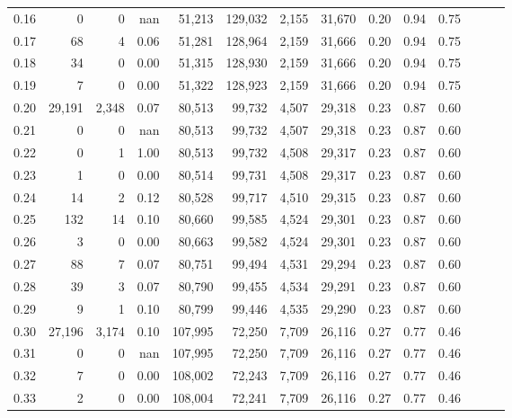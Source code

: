 \begin{tabular}{rrrrrrrrrrrrrr}
0.16 &       0 &      0 &   nan &   51,213 &  129,032 &   2,155 &  31,670 &  0.20 &  0.94 &      0.75 \\
0.17 &      68 &      4 &  0.06 &   51,281 &  128,964 &   2,159 &  31,666 &  0.20 &  0.94 &      0.75 \\
0.18 &      34 &      0 &  0.00 &   51,315 &  128,930 &   2,159 &  31,666 &  0.20 &  0.94 &      0.75 \\
0.19 &       7 &      0 &  0.00 &   51,322 &  128,923 &   2,159 &  31,666 &  0.20 &  0.94 &      0.75 \\
0.20 &  29,191 &  2,348 &  0.07 &   80,513 &   99,732 &   4,507 &  29,318 &  0.23 &  0.87 &      0.60 \\
0.21 &       0 &      0 &   nan &   80,513 &   99,732 &   4,507 &  29,318 &  0.23 &  0.87 &      0.60 \\
0.22 &       0 &      1 &  1.00 &   80,513 &   99,732 &   4,508 &  29,317 &  0.23 &  0.87 &      0.60 \\
0.23 &       1 &      0 &  0.00 &   80,514 &   99,731 &   4,508 &  29,317 &  0.23 &  0.87 &      0.60 \\
0.24 &      14 &      2 &  0.12 &   80,528 &   99,717 &   4,510 &  29,315 &  0.23 &  0.87 &      0.60 \\
0.25 &     132 &     14 &  0.10 &   80,660 &   99,585 &   4,524 &  29,301 &  0.23 &  0.87 &      0.60 \\
0.26 &       3 &      0 &  0.00 &   80,663 &   99,582 &   4,524 &  29,301 &  0.23 &  0.87 &      0.60 \\
0.27 &      88 &      7 &  0.07 &   80,751 &   99,494 &   4,531 &  29,294 &  0.23 &  0.87 &      0.60 \\
0.28 &      39 &      3 &  0.07 &   80,790 &   99,455 &   4,534 &  29,291 &  0.23 &  0.87 &      0.60 \\
0.29 &       9 &      1 &  0.10 &   80,799 &   99,446 &   4,535 &  29,290 &  0.23 &  0.87 &      0.60 \\
0.30 &  27,196 &  3,174 &  0.10 &  107,995 &   72,250 &   7,709 &  26,116 &  0.27 &  0.77 &      0.46 \\
0.31 &       0 &      0 &   nan &  107,995 &   72,250 &   7,709 &  26,116 &  0.27 &  0.77 &      0.46 \\
0.32 &       7 &      0 &  0.00 &  108,002 &   72,243 &   7,709 &  26,116 &  0.27 &  0.77 &      0.46 \\
0.33 &       2 &      0 &  0.00 &  108,004 &   72,241 &   7,709 &  26,116 &  0.27 &  0.77 &      0.46 \\

\end{tabular}
